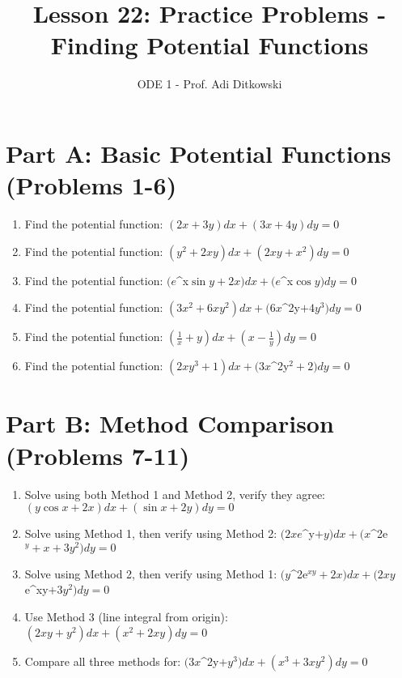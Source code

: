 \documentclass[12pt]{article}
\title{Lesson 22: Practice Problems - Finding Potential Functions}
\author{ODE 1 - Prof. Adi Ditkowski}
\date{}
\begin{document}
\maketitle

\section*{Part A: Basic Potential Functions (Problems 1-6)}

\begin{enumerate}
\item Find the potential function: $(2x + 3y)dx + (3x + 4y)dy = 0$

\item Find the potential function: $(y^{2} + 2xy)dx + (2xy + x^{2})dy = 0$

\item Find the potential function: $(e$^{x}$\sin y + 2x)dx + (e$^{x}$\cos y)dy = 0$

\item Find the potential function: $(3x^{2} + 6xy^{2})dx + (6x$^{2y}$ + 4y^{3})dy = 0$

\item Find the potential function: $\left(\frac{1}{x} + y\right)dx + \left(x - \frac{1}{y}\right)dy = 0$

\item Find the potential function: $(2xy^{3} + 1)dx + (3x$^{2y}$^2 + 2)dy = 0$
\end{enumerate}

\section*{Part B: Method Comparison (Problems 7-11)}

\begin{enumerate}[start=7]
\item Solve using both Method 1 and Method 2, verify they agree:
$(y\cos x + 2x)dx + (\sin x + 2y)dy = 0$

\item Solve using Method 1, then verify using Method 2:
$(2xe$^{y}$ + y)dx + (x$^{2e}$^y + x + 3y^{2})dy = 0$

\item Solve using Method 2, then verify using Method 1:
$(y$^{2e}$^{xy} + 2x)dx + (2xy$e^{xy}$ + 3y^{2})dy = 0$

\item Use Method 3 (line integral from origin):
$(2xy + y^{2})dx + (x^{2} + 2xy)dy = 0$

\item Compare all three methods for:
$(3x$^{2y}$ + y^{3})dx + (x^{3} + 3xy^{2})dy = 0$
\end{enumerate}
\end{document}
